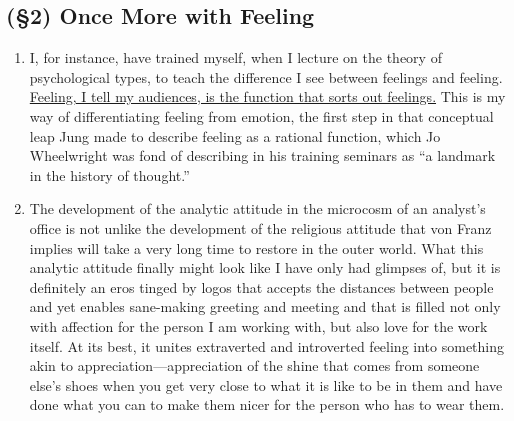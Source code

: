 \subsection{(\S2) Once More with Feeling}

\begin{enumerate}

    \item {} I, for instance, have trained myself,
        when I lecture on the theory of psychological types, to teach the
        difference I see between feelings and feeling. \ul{Feeling, I tell my
        audiences, is the function that sorts out feelings.} This is my way of
        differentiating feeling from emotion, the first step in that conceptual
        leap Jung made to describe feeling as a rational function, which Jo
        Wheelwright was fond of describing in his training seminars as ``a
        landmark in the history of thought.''

    \item {} The development of the analytic attitude
        in the microcosm of an analyst's office is not unlike the development
        of the religious attitude that von Franz implies will take a very long
        time to restore in the outer world. What this analytic attitude finally
        might look like I have only had glimpses of, but it is definitely an
        eros tinged by logos that accepts the distances between people and yet
        enables sane-making greeting and meeting and that is filled not only
        with affection for the person I am working with, but also love for the
        work itself. At its best, it unites extraverted and introverted feeling
        into something akin to appreciation—appreciation of the shine that
        comes from someone else's shoes when you get very close to what it is
        like to be in them and have done what you can to make them nicer for
        the person who has to wear them.

\end{enumerate}
